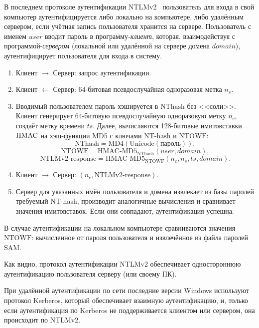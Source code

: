 В последнем протоколе аутентификации NTLMv2~\cite{MS-NLMP} пользователь для входа в свой компьютер аутентифицируется либо локально на компьютере, либо удалённым сервером, если учётная запись пользователя хранится на сервере. Пользователь с именем $user$ вводит пароль в программу-\emph{клиент}, которая, взаимодействуя с программой-\emph{сервером} (локальной или удалённой на сервере домена $domain$), аутентифицирует пользователя для входа в систему.
\begin{enumerate}
    \item Клиент $\rightarrow$ Сервер: запрос аутентификации.
    \item Клиент $\leftarrow$ Сервер: 64-битовая псевдослучайная одноразовая метка $n_s$.
    \item Вводимый пользователем пароль хэшируется в $\textrm{NThash}$ без <<соли>>. Клиент генерирует 64-битовую псевдослучайную одноразовую метку $n_c$, создаёт метку времени $ts$. Далее, вычисляются 128-битовые имитовставки $\textrm{HMAC}$ на хэш-функции MD5 с ключами $\textrm{NT-hash}$ и $\textrm{NTOWF}$:
        \[ \textrm{NThash} = \text{MD4}(\text{Unicode}(\text{пароль})), \]
        \[ \textrm{NTOWF} = \textrm{HMAC-MD5}_{\textrm{NThash}}(user, domain), \]
        \[ \textrm{NTLMv2-response} = \textrm{HMAC-MD5}_{\textrm{NTOWF}}(n_c, n_s, ts, domain). \]
    \item Клиент $\rightarrow$ Сервер: $(n_c, \textrm{NTLMv2-response})$. %
    \item Сервер для указанных имён пользователя и домена извлекает из базы паролей требуемый NT-hash, производит аналогичные вычисления и сравнивает значения имитовставок. Если они совпадают, аутентификация успешна.
\end{enumerate}

В случае аутентификации на локальном компьютере сравниваются значения $\textrm{NTOWF}$: вычисленное от пароля пользователя и извлечённое из файла паролей SAM.

Как видно, протокол аутентификации NTLMv2 обеспечивает одностороннюю аутентификацию пользователя серверу (или своему ПК).

При удалённой аутентификации по сети последние версии Windows используют протокол Kerberos, который обеспечивает взаимную аутентификацию, и, только если аутентификация по Kerberos не поддерживается клиентом или сервером, она происходит по NTLMv2.
